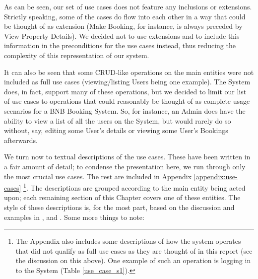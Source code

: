 \vspace{-1cm}
As can be seen, our set of use cases does not feature any inclusions or extensions. Strictly speaking, some of the cases do flow into each other in a way that could be thought of as extension (Make Booking, for instance, is always preceded by View Property Details). We decided not to use extensions and to include this information in the preconditions for the use cases instead, thus reducing the complexity of this representation of our system.

It can also be seen that some CRUD-like operations on the main entities were not included as full use cases (viewing/listing Users being one example). The System does, in fact, support many of these operations, but we decided to limit our list of use cases to operations that could reasonably be thought of as complete usage scenarios for a BNB Booking System. So, for instance, an Admin does have the ability to view a list of all the users on the System, but would rarely do so without, say, editing some User's details or viewing some User's Bookings afterwards.
    
We turn now to textual descriptions of the use cases. These have been written in a fair amount of detail; to condense the presentation here, we run through only the most crucial use cases. The rest are included in Appendix \ref{appendix:use-cases} \footnote{The Appendix also includes some descriptions of how the system operates that did not qualify as full use cases as they are thought of in this report (see the discussion on this above). One example of such an operation is logging in to the System (Table \ref{use_case_s1}).}. The descriptions are grouped according to the main entity being acted upon; each remaining section of this Chapter covers one of these entities. The style of these descriptions is, for the most part, based on the discussion and examples in \cite{Cockburn1998}, \cite{Blain2007} and \cite{TemplateLab}. Some more things to note:

